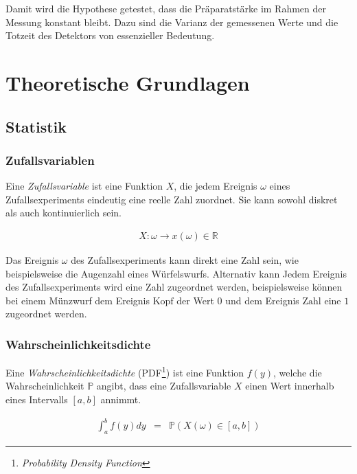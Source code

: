 \documentclass[12pt,a4paper]{scrartcl}
\numberwithin{equation}{section} %
\renewcommand{\[}{} %
\renewcommand{\]}{\noindent} %
\begin{document}
Damit wird die Hypothese getestet, dass die Präparatstärke im Rahmen der
Messung konstant bleibt. Dazu sind die Varianz der gemessenen Werte und
die Totzeit des Detektors von essenzieller Bedeutung.

\clearpage
\hypertarget{theoretische-grundlagen}{%
\section{Theoretische Grundlagen}\label{theoretische-grundlagen}}

\hypertarget{statistik}{\subsection{Statistik}\label{statistik}}

\subsubsection{Zufallsvariablen}
\label{Zufallsvariablen}
Eine \emph{Zufallsvariable} ist eine Funktion $X$, die jedem Ereignis $\omega$ eines Zufallsexperiments eindeutig eine reelle Zahl zuordnet. Sie kann sowohl diskret als auch kontinuierlich sein.

\begin{eqnarray}
	X : \omega \rightarrow x(\omega) \in \mathbb{R}
\end{eqnarray}

\noindent
Das Ereignis $\omega$ des Zufallsexperiments kann direkt eine Zahl sein, wie beispielsweise die Augenzahl eines Würfelswurfs. Alternativ kann Jedem Ereignis des Zufallsexperiments wird eine Zahl zugeordnet werden, beispielsweise können bei einem Münzwurf dem Ereignis $\mathrm{Kopf}$ der Wert $0$ und dem Ereignis $\mathrm{Zahl}$ eine $1$ zugeordnet werden.

\subsubsection{Wahrscheinlichkeitsdichte}
\label{Wahrscheinlichkeitsdichte}
Eine \textit{Wahrscheinlichkeitsdichte} (PDF\footnote{\emph{Probability Density Function}}) ist eine Funktion $f(y)$, welche die Wahrscheinlichkeit $\mathbb P$ angibt, dass eine Zufallsvariable $X$ einen Wert innerhalb eines Intervalls $[a,b]$ annimmt.

\begin{eqnarray}
	\int_{a}^{b} f(y) dy &=& \mathbb P(X(\omega) \in [a,b])
	\label{eq:wahrscheinlichkeitsdichte}
\end{eqnarray}
\end{document}
